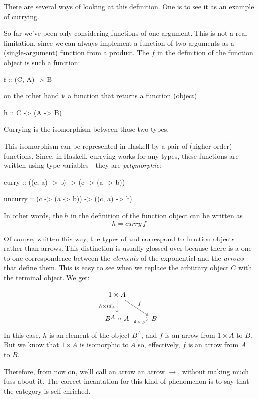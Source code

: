 \documentclass[DaoFP]{subfiles}
\begin{document}
There are several ways of looking at this definition. One is to see it as an example of currying. 

So far we've been only considering functions of one argument. This is not a real limitation, since we can always implement a function of two arguments as a (single-argument) function from a product. The $f$ in the definition of the function object is such a function:
\begin{haskell}
f :: (C, A) -> B
\end{haskell}
 on the other hand is a function that returns a function (object)
\begin{haskell}
h :: C -> (A -> B)
\end{haskell}
Currying is the isomorphism between these two types. 

This isomorphism can be represented in Haskell by a pair of (higher-order) functions. Since, in Haskell, currying works for any types, these functions are written using type variables---they are \emph{polymorphic}:
\begin{haskell}
curry   :: ((c, a) -> b)   -> (c -> (a -> b))
\end{haskell}

\begin{haskell}
uncurry :: (c -> (a -> b)) -> ((c, a) -> b)
\end{haskell}
In other words, the $h$ in the definition of the function object can be written as 
\[ h = curry\, f \]

Of course, written this way, the types of  and  correspond to function objects rather than arrows. This distinction is usually glossed over because there is a one-to-one correspondence between the \emph{elements} of the exponential and the \emph{arrows} that define them. This is easy to see when we replace the arbitrary object $C$ with the terminal object. We get:

\[
 \begin{tikzcd}
 1 \times A
 \arrow[d, dashed, "h \times id_A"']
 \arrow[rd, "f"]
 \\
 B^A \times A
 \arrow[r, "\varepsilon_{A, B}"']
& B
 \end{tikzcd}
\]
In this case, $h$ is an element of the object $B^A$, and $f$ is an arrow from $1 \times A$ to $B$. But we know that $1 \times A$ is isomorphic to $A$ so, effectively, $f$ is an arrow from $A$ to $B$. 

Therefore, from now on, we'll call an arrow \hask{->} an arrow $\to$, without making much fuss about it. The correct incantation for this kind of phenomenon is to say that the category is self-enriched.
\end{document}
